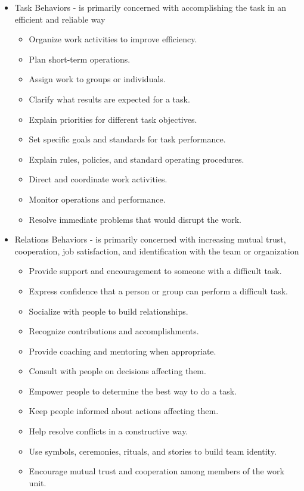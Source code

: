 \begin{itemize}
	\item Task Behaviors - is primarily concerned with accomplishing the task in an efficient and reliable way
	\begin{itemize}
		\item Organize work activities to improve efficiency.
		\item Plan short-term operations.
		\item Assign work to groups or individuals.
		\item Clarify what results are expected for a task.
		\item Explain priorities for different task objectives.
		\item Set specific goals and standards for task performance.
		\item Explain rules, policies, and standard operating procedures.
		\item Direct and coordinate work activities.
		\item Monitor operations and performance.
		\item Resolve immediate problems that would disrupt the work.
	\end{itemize}
	\item Relations Behaviors - is primarily concerned with increasing mutual trust, cooperation, job satisfaction, and identification with the team or organization
	\begin{itemize}
		\item Provide support and encouragement to someone with a difficult task.
		\item Express confidence that a person or group can perform a difficult task.
		\item Socialize with people to build relationships.
		\item Recognize contributions and accomplishments.
		\item Provide coaching and mentoring when appropriate.
		\item Consult with people on decisions affecting them.
		\item Empower people to determine the best way to do a task.
		\item Keep people informed about actions affecting them.
		\item Help resolve conflicts in a constructive way.
		\item Use symbols, ceremonies, rituals, and stories to build team identity.
		\item Encourage mutual trust and cooperation among members of the work unit.

\end{itemize}
\end{itemize}
